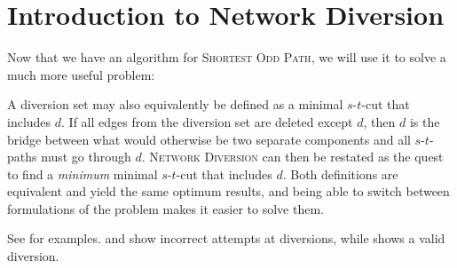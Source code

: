 \section{Introduction to Network Diversion}

Now that we have an algorithm for \textsc{Shortest Odd Path}, we will use it to solve a much more useful problem:

\noindent{}

A diversion set may also equivalently be defined as a minimal $s$-$t$-cut that includes $d$. If all edges from the diversion set are deleted except $d$, then $d$ is the bridge between what would otherwise be two separate components and all $s$-$t$-paths must go through $d$. \textsc{Network Diversion} can then be restated as the quest to find a \emph{minimum} minimal $s$-$t$-cut that includes $d$. Both definitions are equivalent and yield the same optimum results, and being able to switch between formulations of the problem makes it easier to solve them.

See  for examples.  and  show incorrect attempts at diversions, while  shows a valid diversion.

